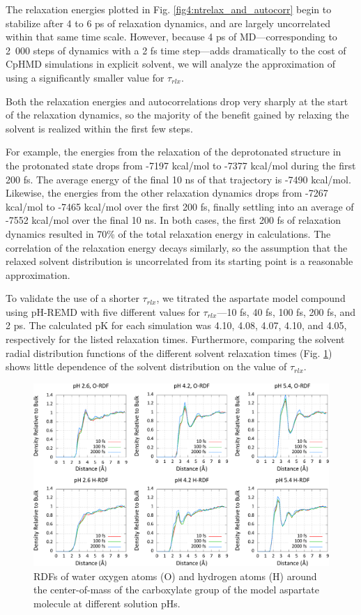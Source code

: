 The relaxation energies plotted in Fig. \ref{fig4:ntrelax_and_autocorr} begin to
stabilize after 4 to 6 ps of relaxation dynamics, and are largely uncorrelated
within that same time scale. However, because 4 ps of MD---corresponding to
\mbox{2 000} steps of dynamics with a 2 fs time step---adds dramatically to the
cost of CpHMD simulations in explicit solvent, we will analyze the approximation
of using a significantly smaller value for $\tau _ {rlx}$.

Both the relaxation energies and autocorrelations drop very sharply at the start
of the relaxation dynamics, so the majority of the benefit gained by relaxing
the solvent is realized within the first few steps.

For example, the energies from the relaxation of the deprotonated structure in
the protonated state drops from -7197 kcal/mol to -7377 kcal/mol during the
first 200 fs. The average energy of the final 10 ns of that trajectory is -7490
kcal/mol. Likewise, the energies from the other relaxation dynamics drops from
-7267 kcal/mol to -7465 kcal/mol over the first 200 fs, finally settling into an
average of -7552 kcal/mol over the final 10 ns. In both cases, the first 200 fs
of relaxation dynamics resulted in 70\% of the total relaxation energy in
calculations. The correlation of the relaxation energy decays similarly, so the
assumption that the relaxed solvent distribution is uncorrelated from its
starting point is a reasonable approximation.

To validate the use of a shorter $\tau _ {rlx}$, we titrated the aspartate model
compound using pH-REMD with five different values for $\tau _ {rlx}$---10 fs, 40
fs, 100 fs, 200 fs, and 2 ps. The calculated pK for each simulation was
4.10, 4.08, 4.07, 4.10, and 4.05, respectively for the listed relaxation times.
Furthermore, comparing the solvent radial distribution functions of the
different solvent relaxation times (Fig. \ref{fig4:ntrelax_rdfs}) shows little
dependence of the solvent distribution on the value of $\tau _ {rlx}$.

\begin{figure}
   \includegraphics[width=6.5in]{ntrelax_radial_ph.eps}
   \caption{RDFs of water oxygen atoms (O) and hydrogen atoms (H) around the
            center-of-mass of the carboxylate group of the model aspartate
            molecule at different solution pHs.}
   \label{fig4:ntrelax_rdfs}
\end{figure}

